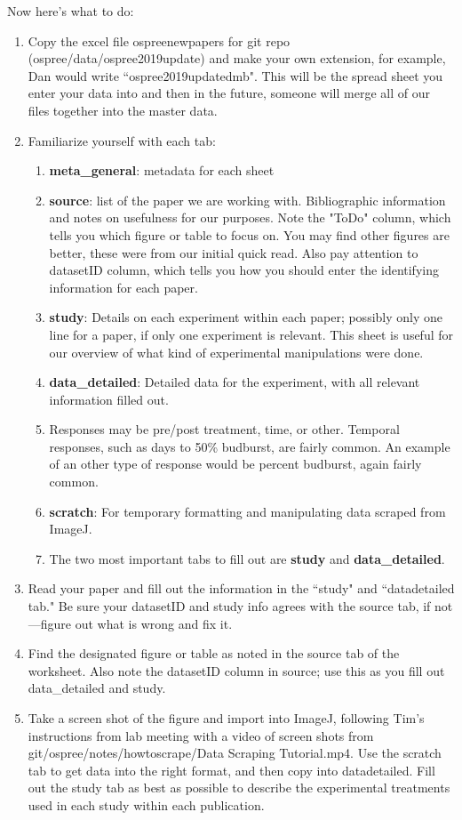 \documentclass{article}[12pt]
\begin{document}
Now here's what to do:
\begin{enumerate}
\item Copy the excel file ospree\textunderscore newpapers for git repo (ospree/data/ospree\textunderscore 2019update) and make your own extension, for example, Dan would write ``ospree\textunderscore 2019update\textunderscore dmb". This will be the spread sheet you enter your data into and then in the future, someone will merge all of our files together into the master data.
\item Familiarize yourself with each tab:
  \begin{enumerate}
  \item \textbf{meta\_general}: metadata for each sheet
  \item \textbf{source}: list of the paper we are working with. Bibliographic information and notes on usefulness for our purposes. Note the "ToDo" column, which tells you which figure or table to focus on. You may find other figures are better, these were from our initial quick read. Also pay attention to datasetID column, which tells you how you should enter the identifying information for each paper.
  \item \textbf{study}: Details on each experiment within each paper; possibly only one line for a paper, if only one experiment is relevant. This sheet is useful for our overview of what kind of experimental manipulations were done.
  \item \textbf{data\_detailed}: Detailed data for the experiment, with all relevant information filled out.
  \item Responses may be pre/post treatment, time, or other. Temporal responses, such as days to 50\% budburst, are fairly common. An example of an other type of response would be percent budburst, again fairly common.
  \item \textbf{scratch}: For temporary formatting and manipulating data scraped from ImageJ.
  \item The two most important tabs to fill out are \textbf{study} and \textbf{data\_detailed}. 
  \end{enumerate}
\item Read your paper and fill out the information in the ``study" and ``data\textunderscore detailed tab." Be sure your datasetID and study info agrees with the source tab, if not---figure out what is wrong and fix it.
\item Find the designated figure or table as noted in the source tab of the worksheet. Also note the datasetID column in source; use this as you fill out data\_detailed and study.
\item Take a screen shot of the figure and import into ImageJ, following Tim's instructions from lab meeting with a video of screen shots from git/ospree/notes/howtoscrape/Data Scraping Tutorial.mp4. Use the scratch tab to get data into the right format, and then copy into data\textunderscore detailed. Fill out the study tab as best as possible to describe the experimental treatments used in each study within each publication.
\end{enumerate}
\end{document}
